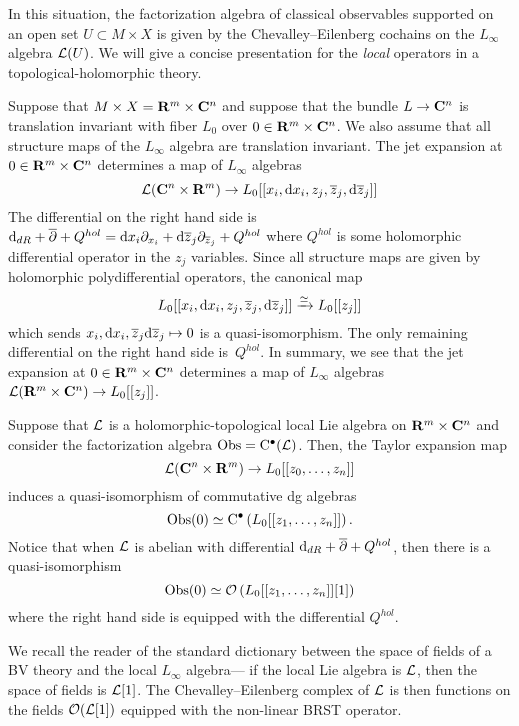 In this situation, the factorization algebra of classical observables supported on an open set $U \subset M \times X$ is given by the Chevalley--Eilenberg cochains on the $L_\infty$ algebra $\mathcal L(U)$. 
We will give a concise presentation for the {\em local} operators in a topological-holomorphic theory. 

Suppose that $M \times X = \mathbf{R}^m \times \mathbf{C}^n$ and suppose that the bundle $L \to \mathbf{C}^n$ is translation invariant with fiber $L_0$ over $0 \in \mathbf{R}^m \times \mathbf{C}^n$.
We also assume that all structure maps of the $L_\infty$ algebra are translation invariant.
The jet expansion at $0 \in \mathbf{R}^m \times \mathbf{C}^n$ determines a map of $L_\infty$ algebras
\[
\mathcal L(\mathbf{C}^n \times \mathbf{R}^m) \to L_0 [[x_i, {\rm d} x_i,z_j, \overline{z}_j, {\rm d} \overline{z}_j]] 
\]
The differential on the right hand side is ${\rm d}_{dR} + \overline{\partial} + Q^{hol} = {\rm d} x_i \partial_{x_i} + {\rm d} \overline{z}_j \partial_{\overline{z}_j} + Q^{hol}$ where $Q^{hol}$ is some holomorphic differential operator in the $z_j$ variables. 
Since all structure maps are given by holomorphic polydifferential operators, the canonical map 
\[
L_0 [[x_i, {\rm d} x_i,z_j, \overline{z}_j, {\rm d} \overline{z}_j]] \xrightarrow{\simeq} L_0 [[z_j]] 
\]
which sends $x_i, {\rm d} x_i,\overline{z}_j {\rm d} \overline{z}_j \mapsto 0$ is a quasi-isomorphism. 
The only remaining differential on the right hand side is~$Q^{hol}$. 
In summary, we see that the jet expansion at $0 \in \mathbf{R}^m \times \mathbf{C}^n$ determines a map of $L_\infty$ algebras $\mathcal L(\mathbf{R}^m \times \mathbf{C}^n) \to L_0[[z_j]]$. 
 
\begin{lem}
\label{lem:localops}
Suppose that $\mathcal L$ is a holomorphic-topological local Lie algebra on $\mathbf{R}^m \times \mathbf{C}^n$ and consider the factorization algebra $\operatorname{Obs} = {\rm C}^\bullet (\mathcal L)$. 
Then, the Taylor expansion map
\[
\mathcal L(\mathbf{C}^n \times \mathbf{R}^m) \to L_0[[z_0,\ldots,z_n]]
\]
induces a quasi-isomorphism of commutative dg algebras
\[
\operatorname{Obs}(0) \simeq {\rm C}^\bullet \left( L_0[[z_1,\ldots,z_n]] \right) .
\]
Notice that when $\mathcal L$ is abelian with differential ${\rm d}_{dR} + \overline{\partial} + Q^{hol}$, then there is a quasi-isomorphism
\[
\operatorname{Obs}(0) \simeq \mathcal O \left( L_0[[z_1,\ldots,z_n]][1] \right) 
\]
where the right hand side is equipped with the differential $Q^{hol}$. 
\end{lem}

We recall the reader of the standard dictionary between the space of fields of a BV theory and the local $L_\infty$ algebra---
if the local Lie algebra is $\mathcal L$, then the space of fields is $\mathcal L[1]$. 
The Chevalley--Eilenberg complex of $\mathcal L$ is then functions on the fields $\mathcal O(\mathcal L[1])$ equipped with the non-linear BRST operator.

